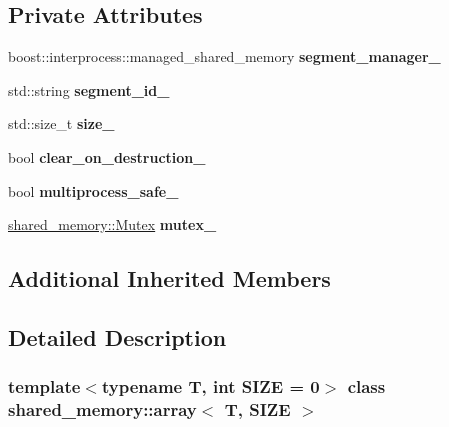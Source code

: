 \subsection*{Private Attributes}
\begin{DoxyCompactItemize}
\item 
\mbox{\label{classshared__memory_1_1array_a43c56477481ae684932b6a03b64d7b67}} 
boost\+::interprocess\+::managed\+\_\+shared\+\_\+memory {\bfseries segment\+\_\+manager\+\_\+}
\item 
\mbox{\label{classshared__memory_1_1array_a25a07e97c454f8fb122eb092ab29812c}} 
std\+::string {\bfseries segment\+\_\+id\+\_\+}
\item 
\mbox{\label{classshared__memory_1_1array_a1b47b48a2779e766a80403f47404876a}} 
std\+::size\+\_\+t {\bfseries size\+\_\+}
\item 
\mbox{\label{classshared__memory_1_1array_afb6fcb395ac52cb9eaaef2882b623d23}} 
bool {\bfseries clear\+\_\+on\+\_\+destruction\+\_\+}
\item 
\mbox{\label{classshared__memory_1_1array_a7051346ccb28372b2ea5587714113079}} 
bool {\bfseries multiprocess\+\_\+safe\+\_\+}
\item 
\mbox{\label{classshared__memory_1_1array_afaf6604cf5e2c380f86679e1515e6674}} 
\hyperlink{classshared__memory_1_1Mutex}{shared\+\_\+memory\+::\+Mutex} {\bfseries mutex\+\_\+}
\end{DoxyCompactItemize}
\subsection*{Additional Inherited Members}


\subsection{Detailed Description}
\subsubsection*{template$<$typename T, int S\+I\+ZE = 0$>$\newline
class shared\+\_\+memory\+::array$<$ T, S\+I\+Z\+E $>$}

